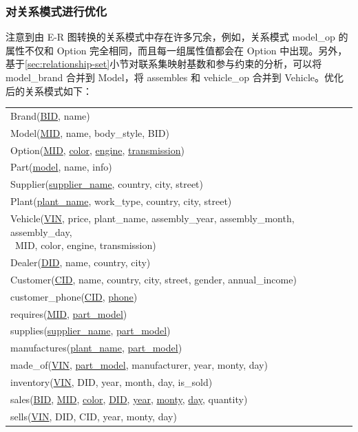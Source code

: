 \documentclass[hyperref,a4paper,UTF8]{ctexart}
\begin{document}
\subsubsection{对关系模式进行优化\label{sec:对关系模式进行优化}}

注意到由 E-R 图转换的关系模式中存在许多冗余，例如，关系模式 model\_op 的属性不仅和 Option 完全相同，而且每一组属性值都会在 Option 中出现。另外，基于\ref{sec:relationship-set}小节对联系集映射基数和参与约束的分析，可以将 model\_brand 合并到 Model，将 assembles 和 vehicle\_op 合并到 Vehicle。优化后的关系模式如下：

\begin{center}
    \begin{tabular}{l}
        Brand(\underline{BID}, name)\\
        Model(\underline{MID}, name, body\_style, BID)\\
        Option(\underline{MID}, \underline{color}, \underline{engine}, \underline{transmission})\\
        Part(\underline{model}, name, info)\\
        Supplier(\underline{supplier\_name}, country, city, street)\\
        Plant(\underline{plant\_name}, work\_type, country, city, street)\\
        \makecell[l]{Vehicle(\underline{VIN}, price, plant\_name, assembly\_year, assembly\_month, assembly\_day, \\ \qquad \quad \  MID, color, engine, transmission)}\\
        Dealer(\underline{DID}, name, country, city)\\
        Customer(\underline{CID}, name, country, city, street, gender, annual\_income)\\
        customer\_phone(\underline{CID}, \underline{phone})\\
        requires(\underline{MID}, \underline{part\_model})\\
        supplies(\underline{supplier\_name}, \underline{part\_model})\\
        manufactures(\underline{plant\_name}, \underline{part\_model})\\
        made\_of(\underline{VIN}, \underline{part\_model}, manufacturer, year, monty, day)\\
        inventory(\underline{VIN}, DID, year, month, day, is\_sold)\\
        sales(\underline{BID}, \underline{MID}, \underline{color}, \underline{DID}, \underline{year}, \underline{monty}, \underline{day}, quantity)\\
        sells(\underline{VIN}, DID, CID, year, monty, day)
    \end{tabular}
\end{center}
\end{document}
